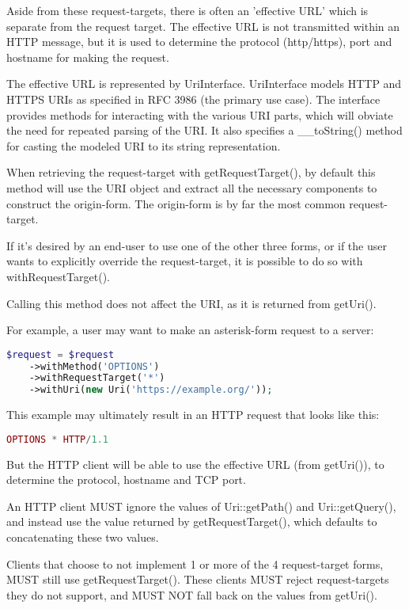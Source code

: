 Aside from these request-targets, there is often an 'effective URL' which is separate from the request target. The effective URL is not transmitted within an HTTP message, but it is used to determine the protocol (http/https), port and hostname for making the request.

The effective URL is represented by UriInterface. UriInterface models HTTP and HTTPS URIs as specified in RFC 3986 (the primary use case). The interface provides methods for interacting with the various URI parts, which will obviate the need for repeated parsing of the URI. It also specifies a \_\_toString() method for casting the modeled URI to its string representation.

When retrieving the request-target with getRequestTarget(), by default this method will use the URI object and extract all the necessary components to construct the origin-form. The origin-form is by far the most common request-target.

If it's desired by an end-user to use one of the other three forms, or if the user wants to explicitly override the request-target, it is possible to do so with withRequestTarget().

Calling this method does not affect the URI, as it is returned from getUri().

For example, a user may want to make an asterisk-form request to a server:

\begin{lstlisting}[language=PHP]
$request = $request
    ->withMethod('OPTIONS')
    ->withRequestTarget('*')
    ->withUri(new Uri('https://example.org/'));
\end{lstlisting}

This example may ultimately result in an HTTP request that looks like this:

\begin{lstlisting}[language=PHP]
OPTIONS * HTTP/1.1
\end{lstlisting}


But the HTTP client will be able to use the effective URL (from getUri()), to determine the protocol, hostname and TCP port.

An HTTP client MUST ignore the values of Uri::getPath() and Uri::getQuery(), and instead use the value returned by getRequestTarget(), which defaults to concatenating these two values.

Clients that choose to not implement 1 or more of the 4 request-target forms, MUST still use getRequestTarget(). These clients MUST reject request-targets they do not support, and MUST NOT fall back on the values from getUri().

